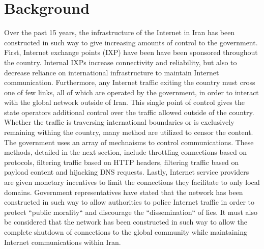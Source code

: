 \section{Background}\label{sec:background}

Over the past 15 years, the infrastructure of the Internet in Iran has been constructed in such way to give increasing amounts of control to the government. First, Internet exchange points (IXP) have been have been sponsored throughout the country. Internal IXPs increase connectivity and reliability, but also to decrease reliance on international infrastructure to maintain Internet communication. Furthermore, any Internet traffic exiting the country must cross one of few links, all of which are operated by the government, in order to interact with the global network outside of Iran. This single point of control gives the state operators additional control over the traffic allowed outside of the country. Whether the traffic is traversing international boundaries or is exclusively remaining withing the country, many method are utilized to censor the content. \\
The government uses an array of mechnaisms to control communications. These methods, detailed in the next section, include throttling connections based on protocols, filtering traffic based on HTTP headers, filtering traffic based on payload content and hijacking DNS requests. Lastly, Internet service providers are given monetary incentives to limit the connections they facilitate to only local domains. Government representatives have stated that the network has been constructed in such way to allow authorities to police Internet traffic in order to protect ``public morality`` and discourage the ``dissemination`` of lies. It must also be considered that the network has been constructed in such way to allow the complete shutdown of connections to the global community while maintaining Internet communications within Iran.
